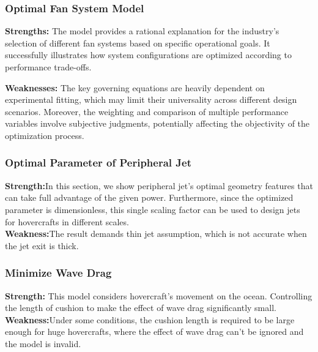 \subsubsection{Optimal Fan System Model}

\textbf{Strengths:} The model provides a rational explanation for the industry's selection of different fan systems based on specific operational goals. It successfully illustrates how system configurations are optimized according to performance trade-offs.

\textbf{Weaknesses:} The key governing equations are heavily dependent on experimental fitting, which may limit their universality across different design scenarios. Moreover, the weighting and comparison of multiple performance variables involve subjective judgments, potentially affecting the objectivity of the optimization process.



\subsubsection{Optimal Parameter of Peripheral Jet}
\textbf{Strength:}In this section, we show peripheral jet's optimal geometry features that can take full advantage of the given power. Furthermore, since the optimized parameter is dimensionless, this single scaling factor can be used to design jets for hovercrafts in different scales.\\
\textbf{Weakness:}The result demands thin jet assumption, which is not accurate when the jet exit is thick.\\
\subsubsection{Minimize Wave Drag}
\textbf{Strength:} This model considers hovercraft's movement on the ocean. Controlling the length of cushion to make the effect of wave drag significantly small.\\
\textbf{Weakness:}Under some conditions, the cushion length is required to be large enough for huge hovercrafts, where the effect of wave drag can't be ignored and the model is invalid.\\
